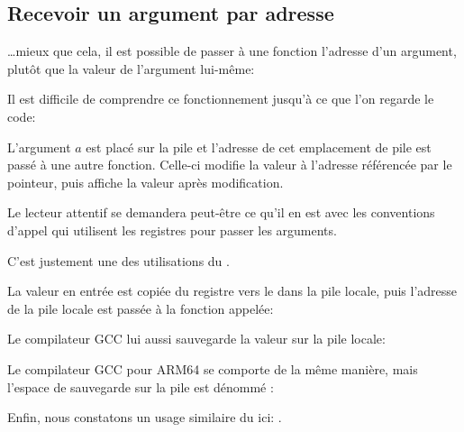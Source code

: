 ﻿\subsection{Recevoir un argument par adresse}
\label{pointer_to_argument}

\dots mieux que cela, il est possible de passer à une fonction l'adresse d'un argument, plutôt que 
la valeur de l'argument lui-même:



Il est difficile de comprendre ce fonctionnement jusqu'à ce que l'on regarde le code:



L'argument $a$ est placé sur la pile et l'adresse de cet emplacement de pile est passé à une autre
fonction. Celle-ci modifie la valeur à l'adresse référencée par le pointeur, puis \printf affiche 
la valeur après modification.

\par Le lecteur attentif se demandera peut-être ce qu'il en est avec les conventions d'appel qui 
utilisent les registres pour passer les arguments.

C'est justement une des utilisations du .

La valeur en entrée est copiée du registre vers le  dans la pile locale, puis 
l'adresse de la pile locale est passée à la fonction appelée:



Le compilateur GCC lui aussi sauvegarde la valeur sur la pile locale:



Le compilateur GCC pour ARM64 se comporte de la même manière, mais l'espace de sauvegarde sur la pile 
est dénommé  :



Enfin, nous constatons un usage similaire du  ici: .

